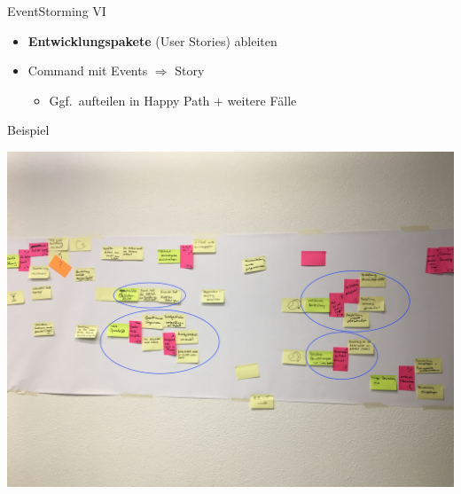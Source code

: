 \begin{frame}[fragile]{EventStorming VI}

\begin{itemize}
\item \textbf{Entwicklungspakete} (User Stories) ableiten
\item Command mit Events $\Rightarrow$ Story
\begin{itemize}
\item Ggf.~aufteilen in Happy Path + weitere Fälle
\end{itemize}
\end{itemize}

\end{frame}

\begin{frame}[fragile]{Beispiel}

\begin{center}
\includegraphics[width=.85\textwidth]{pics/eventstorming_stories.jpg}
\end{center}

\end{frame}



